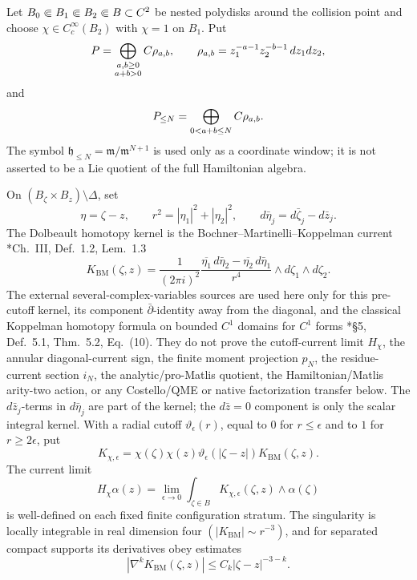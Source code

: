 \documentclass[11pt]{memoir}
\begin{document}
\begin{prop}\label{prop:finite-window-bm-native-e2-transfer}
  Let
  \(B_0\Subset B_1\Subset B_2\Subset B\subset C^2\) be nested polydisks
  around the collision point and choose
  \(\chi\in C_c^\infty(B_2)\) with \(\chi=1\) on \(B_1\).  Put
  \[
    P
      =
      \bigoplus_{\substack{a,b\geq0\\a+b>0}}C\rho_{a,b},
    \qquad
    \rho_{a,b}=z_1^{-a-1}z_2^{-b-1}\,dz_1dz_2,
  \]
  and
  \[
    P_{\leq N}
      =
      \bigoplus_{0<a+b\leq N}C\rho_{a,b}.
  \]
  The symbol \(\mathfrak h_{\leq N}=\mathfrak m/\mathfrak m^{N+1}\) is
  used only as a coordinate window; it is not asserted to be a Lie
  quotient of the full Hamiltonian algebra.

  On
  \((B_\zeta\times B_z)\setminus\Delta\), set
  \[
    \eta=\zeta-z,\qquad
    r^2=|\eta_1|^2+|\eta_2|^2,\qquad
    d\bar\eta_j=d\bar\zeta_j-d\bar z_j .
  \]
  The Dolbeault homotopy kernel is the
  Bochner--Martinelli--Koppelman current
  \cite{laurent-thiebaut-bmk}*{Ch.~III, Def.~1.2, Lem.~1.3}
  \[
    K_{\mathrm{BM}}(\zeta,z)
    =
    \frac{1}{(2\pi i)^2}
    \frac{
      \overline{\eta_1}\,d\bar\eta_2
      -
      \overline{\eta_2}\,d\bar\eta_1
    }{r^4}
    \wedge d\zeta_1\wedge d\zeta_2 .
  \]
  The external several-complex-variables sources are used here only for
  this pre-cutoff kernel, its component \(\bar\partial\)-identity away
  from the diagonal, and the classical Koppelman homotopy formula on
  bounded \(C^1\) domains for \(C^1\) forms
  \cite{ruppenthal-bmk}*{\S5, Def.~5.1, Thm.~5.2, Eq.~(10)}.  They do
  not prove the cutoff-current limit \(H_\chi\), the annular
  diagonal-current sign, the finite moment projection \(p_N\), the
  residue-current section \(i_N\), the analytic/pro-Matlis quotient, the
  Hamiltonian/Matlis arity-two action, or any Costello/QME or native
  factorization transfer below.
  The \(d\bar z_j\)-terms in \(d\bar\eta_j\) are part of the kernel; the
  \(d\bar z=0\) component is only the scalar integral kernel.  With a
  radial cutoff \(\vartheta_\epsilon(r)\), equal to \(0\) for
  \(r\leq\epsilon\) and to \(1\) for \(r\geq2\epsilon\), put
  \[
    K_{\chi,\epsilon}
      =
      \chi(\zeta)\chi(z)\vartheta_\epsilon(|\zeta-z|)
      K_{\mathrm{BM}}(\zeta,z).
  \]
  The current limit
  \[
    H_\chi\alpha(z)
      =
      \lim_{\epsilon\to0}
      \int_{\zeta\in B}K_{\chi,\epsilon}(\zeta,z)\wedge\alpha(\zeta)
  \]
  is well-defined on each fixed finite configuration stratum.  The
  singularity is locally integrable in real dimension four
  \((|K_{\mathrm{BM}}|\sim r^{-3})\), and for separated compact supports
  its derivatives obey estimates
  \[
    |\nabla^kK_{\mathrm{BM}}(\zeta,z)|
      \leq C_k|\zeta-z|^{-3-k}.
  \]


\end{prop}
\end{document}

